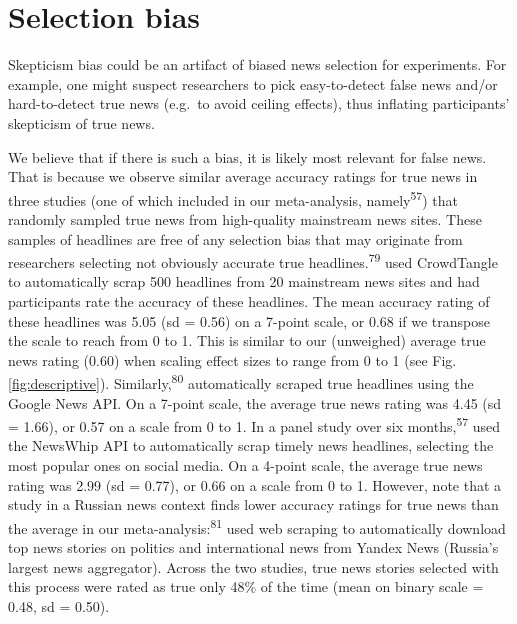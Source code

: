 \documentclass[
  doc,floatsintext]{apa6}
\begin{document}
\clearpage

\section{Selection bias}\label{selection-bias}

Skepticism bias could be an artifact of biased news selection for experiments. For example, one might suspect researchers to pick easy-to-detect false news and/or hard-to-detect true news (e.g.~to avoid ceiling effects), thus inflating participants' skepticism of true news.

We believe that if there is such a bias, it is likely most relevant for false news. That is because we observe similar average accuracy ratings for true news in three studies (one of which included in our meta-analysis, namely\textsuperscript{57}) that randomly sampled true news from high-quality mainstream news sites. These samples of headlines are free of any selection bias that may originate from researchers selecting not obviously accurate true headlines.\textsuperscript{79} used CrowdTangle to automatically scrap 500 headlines from 20 mainstream news sites and had participants rate the accuracy of these headlines. The mean accuracy rating of these headlines was 5.05 (sd = 0.56) on a 7-point scale, or 0.68 if we transpose the scale to reach from 0 to 1. This is similar to our (unweighed) average true news rating (0.60) when scaling effect sizes to range from 0 to 1 (see Fig. \ref{fig:descriptive}). Similarly,\textsuperscript{80} automatically scraped true headlines using the Google News API. On a 7-point scale, the average true news rating was 4.45 (sd = 1.66), or 0.57 on a scale from 0 to 1. In a panel study over six months,\textsuperscript{57} used the NewsWhip API to automatically scrap timely news headlines, selecting the most popular ones on social media. On a 4-point scale, the average true news rating was 2.99 (sd = 0.77), or 0.66 on a scale from 0 to 1. However, note that a study in a Russian news context finds lower accuracy ratings for true news than the average in our meta-analysis:\textsuperscript{81} used web scraping to automatically download top news stories on politics and international news from Yandex News (Russia's largest news aggregator). Across the two studies, true news stories selected with this process were rated as true only 48\% of the time (mean on binary scale = 0.48, sd = 0.50).
\end{document}
